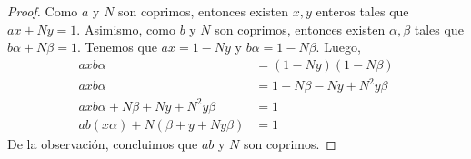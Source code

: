 \documentclass[main.tex]{subfiles}
\begin{document}
\begin{proof}
    Como $a$ y $N$ son coprimos, entonces existen $x, y$ enteros tales que $ax + Ny = 1$. Asimismo, como $b$ y $N$ son coprimos, entonces existen $\alpha, \beta$ tales que $b\alpha + N\beta = 1$. Tenemos que $ax = 1 - Ny$ y $b\alpha = 1 - N\beta$. Luego,
    \begin{align*}
        axb\alpha &= (1 - Ny)(1 - N\beta) \\
        axb\alpha &= 1 - N\beta - Ny + N^2y\beta \\
        axb\alpha + N\beta + Ny + N^2y\beta &= 1 \\
        ab(x\alpha) + N(\beta + y + Ny\beta) &= 1
    \end{align*}
   De la observaci\'on, concluimos que $ab$ y $N$ son coprimos. 
\end{proof}
\end{document}
